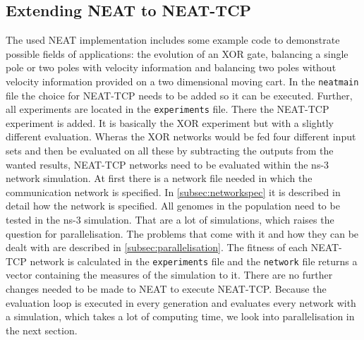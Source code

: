 \subsection{Extending NEAT to NEAT-TCP}
The used NEAT implementation includes some example code to demonstrate possible fields of applications: the evolution of an XOR gate, balancing a single pole or two poles with velocity information and balancing two poles without velocity information provided on a two dimensional moving cart. In the \texttt{neatmain} file the choice for NEAT-TCP needs to be added so it can be executed. Further, all experiments are located in the \texttt{experiments} file. There the NEAT-TCP experiment is added. It is basically the XOR experiment but with a slightly different evaluation. Wheras the XOR networks would be fed four different input sets and then be evaluated on all these by subtracting the outputs from the wanted results, NEAT-TCP networks need to be evaluated within the ns-3 network simulation. At first there is a network file needed in which the communication network is specified. In \autoref{subsec:networkspec} it is described in detail how the network is specified. All genomes in the population need to be tested in the ns-3 simulation. That are a lot of simulations, which raises the question for parallelisation. The problems that come with it and how they can be dealt with are described in \autoref{subsec:parallelisation}. The fitness of each NEAT-TCP network is calculated in the \texttt{experiments} file and the \texttt{network} file returns a vector containing the measures of the simulation to it.  There are no further changes needed to be made to NEAT to execute NEAT-TCP. Because the evaluation loop is executed in every generation and evaluates every network with a simulation, which takes a lot of computing time, we look into parallelisation in the next section.

